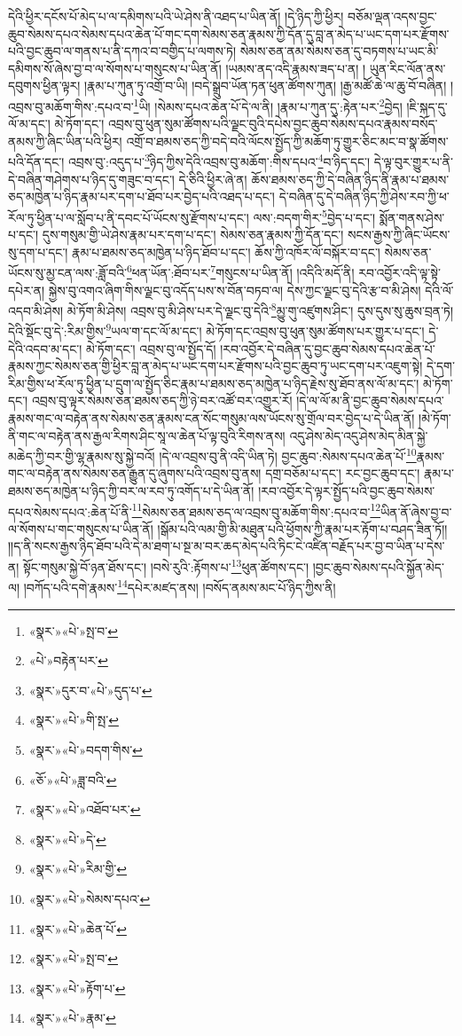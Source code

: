 དེའི་ཕྱིར་དངོས་པོ་མེད་པ་ལ་དམིགས་པའི་ཡེ་ཤེས་ནི་འཐད་པ་ཡིན་ནོ། །དེ་ཉིད་ཀྱི་ཕྱིར། བཅོམ་ལྡན་འདས་བྱང་ཆུབ་སེམས་དཔའ་སེམས་དཔའ་ཆེན་པོ་གང་དག་སེམས་ཅན་རྣམས་ཀྱི་དོན་དུ་བླ་ན་མེད་པ་ཡང་དག་པར་རྫོགས་པའི་བྱང་ཆུབ་ལ་གནས་པ་ནི་དཀའ་བ་བགྱིད་པ་ལགས་ཏེ། སེམས་ཅན་ནམ་སེམས་ཅན་དུ་བཏགས་པ་ཡང་མི་དམིགས་སོ་ཞེས་བྱ་བ་ལ་སོགས་པ་གསུངས་པ་ཡིན་ནོ། །ཡམས་ནད་འདི་རྣམས་ཟད་པ་ན། །
ཡུན་རིང་ལོན་ནས་དབུགས་ཕྱིན་ལྟར། །རྣམ་པ་ཀུན་ཏུ་འགྲོ་བ་ཡི། །བདེ་སྒྲུབ་ཡོན་ཏན་ཕུན་ཚོགས་ཀུན། །རྒྱ་མཚོ་ཆེ་ལ་ཆུ་བོ་བཞིན། །འབྲས་བུ་མཆོག་གིས་:དཔའ་བ་\footnote{«སྣར་»«པེ་»སྤ་བ་}ཡི། །སེམས་དཔའ་ཆེན་པོ་དེ་ལ་ནི། །རྣམ་པ་ཀུན་དུ་:རྟེན་པར་\footnote{«པེ་»བརྟེན་པར་}བྱེད། །ཇི་སྐད་དུ་ལོ་མ་དང་། མེ་ཏོག་དང་། འབྲས་བུ་ཕུན་སུམ་ཚོགས་པའི་ལྗང་བུའི་དཔེས་བྱང་ཆུབ་སེམས་དཔའ་རྣམས་བསོད་ནམས་ཀྱི་ཞིང་ཡིན་པའི་ཕྱིར། འགྲོ་བ་ཐམས་ཅད་ཀྱི་བདེ་བའི་ལོངས་སྤྱོད་ཀྱི་མཆོག་ཏུ་གྱུར་ཅིང་མང་བ་སྣ་ཚོགས་པའི་དོན་དང་། འབྲས་བུ་:འདུད་པ་\footnote{«སྣར་»དུར་བ་«པེ་»དུད་པ་}ཉིད་ཀྱིས་དེའི་འབྲས་བུ་མཆོག་:གིས་དཔའ་\footnote{«སྣར་»«པེ་»གི་སྤ་}བ་ཉིད་དང་། དེ་ལྟ་བུར་གྱུར་པ་ནི་དེ་བཞིན་གཤེགས་པ་ཉིད་དུ་གཟུང་བ་དང་། དེ་ཅིའི་ཕྱིར་ཞེ་ན། ཆོས་ཐམས་ཅད་ཀྱི་དེ་བཞིན་ཉིད་ནི་རྣམ་པ་ཐམས་ཅད་མཁྱེན་པ་ཉིད་རྣམ་པར་དག་པ་ཐོབ་པར་བྱེད་པའི་འཐད་པ་དང་། དེ་བཞིན་དུ་དེ་བཞིན་ཉིད་ཀྱི་ཤེས་རབ་ཀྱི་ཕ་རོལ་ཏུ་ཕྱིན་པ་ལ་སློབ་པ་ནི་དབང་པོ་ཡོངས་སུ་རྫོགས་པ་དང་། ལས་:བདག་གིར་\footnote{«སྣར་»«པེ་»བདག་གིས་}བྱེད་པ་དང་། སྨོན་གནས་ཤེས་པ་དང་། དུས་གསུམ་གྱི་ཡེ་ཤེས་རྣམ་པར་དག་པ་དང་། སེམས་ཅན་རྣམས་ཀྱི་དོན་དང་། སངས་རྒྱས་ཀྱི་ཞིང་ཡོངས་སུ་དག་པ་དང་། རྣམ་པ་ཐམས་ཅད་མཁྱེན་པ་ཉིད་ཐོབ་པ་དང་། ཆོས་ཀྱི་འཁོར་ལོ་བསྐོར་བ་དང་། སེམས་ཅན་ཡོངས་སུ་མྱ་ངན་ལས་:ཟློ་བའི་\footnote{«ཅོ་»«པེ་»ཟླ་བའི་}ཕན་ཡོན་:ཐོབ་པར་\footnote{«སྣར་»«པེ་»འཐོབ་པར་}གསུངས་པ་ཡིན་ནོ། །འདིའི་མདོ་ནི། རབ་འབྱོར་འདི་ལྟ་སྟེ་དཔེར་ན། སྐྱེས་བུ་འགའ་ཞིག་གིས་ལྗང་བུ་འདོད་པས་ས་བོན་བཏབ་ལ། དེས་ཀྱང་ལྗང་བུ་དེའི་རྩ་བ་མི་ཤེས། དེའི་ལོ་འདབ་མི་ཤེས། མེ་ཏོག་མི་ཤེས། འབྲས་བུ་མི་ཤེས་པར་དེ་ལྗང་བུ་དེའི་\footnote{«སྣར་»«པེ་»དེ་}མྱུ་གུ་འཛུགས་ཤིང་། དུས་དུས་སུ་ཆུས་བྲན་ཏེ། དེའི་སྡོང་བུ་དེ་:རིམ་གྱིས་\footnote{«སྣར་»«པེ་»རིམ་གྱི་}ཡལ་ག་དང་ལོ་མ་དང་། མེ་ཏོག་དང་འབྲས་བུ་ཕུན་སུམ་ཚོགས་པར་གྱུར་པ་དང་། དེ་དེའི་འདབ་མ་དང་། མེ་ཏོག་དང་། འབྲས་བུ་ལ་སྤྱོད་དོ། །རབ་འབྱོར་དེ་བཞིན་དུ་བྱང་ཆུབ་སེམས་དཔའ་ཆེན་པོ་རྣམས་ཀྱང་སེམས་ཅན་གྱི་ཕྱིར་བླ་ན་མེད་པ་ཡང་དག་པར་རྫོགས་པའི་བྱང་ཆུབ་ཏུ་ཡང་དག་པར་འཇུག་སྟེ། དེ་དག་རིམ་གྱིས་ཕ་རོལ་ཏུ་ཕྱིན་པ་དྲུག་ལ་སྤྱོད་ཅིང་རྣམ་པ་ཐམས་ཅད་མཁྱེན་པ་ཉིད་རྗེས་སུ་ཐོབ་ནས་ལོ་མ་དང་། མེ་ཏོག་དང་། འབྲས་བུ་ལྟར་སེམས་ཅན་ཐམས་ཅད་ཀྱི་ཉེ་བར་འཚོ་བར་འགྱུར་རོ། །དེ་ལ་ལོ་མ་ནི་བྱང་ཆུབ་སེམས་དཔའ་རྣམས་གང་ལ་བརྟེན་ནས་སེམས་ཅན་རྣམས་ངན་སོང་གསུམ་ལས་ཡོངས་སུ་གྲོལ་བར་བྱེད་པ་དེ་ཡིན་ནོ། །མེ་ཏོག་ནི་གང་ལ་བརྟེན་ནས་རྒྱལ་རིགས་ཤིང་སཱ་ལ་ཆེན་པོ་ལྟ་བུའི་རིགས་ནས། འདུ་ཤེས་མེད་འདུ་ཤེས་མེད་མིན་སྐྱེ་མཆེད་ཀྱི་བར་གྱི་ལྷ་རྣམས་སུ་སྐྱེ་བའོ། །དེ་ལ་འབྲས་བུ་ནི་འདི་ཡིན་ཏེ། བྱང་ཆུབ་:སེམས་དཔའ་ཆེན་པོ་\footnote{«སྣར་»«པེ་»སེམས་དཔའ་}རྣམས་གང་ལ་བརྟེན་ནས་སེམས་ཅན་རྒྱུན་དུ་ཞུགས་པའི་འབྲས་བུ་ནས། དགྲ་བཅོམ་པ་དང་། རང་བྱང་ཆུབ་དང་། རྣམ་པ་ཐམས་ཅད་མཁྱེན་པ་ཉིད་ཀྱི་བར་ལ་རབ་ཏུ་འགོད་པ་དེ་ཡིན་ནོ། །རབ་འབྱོར་དེ་ལྟར་སྤྱོད་པའི་བྱང་ཆུབ་སེམས་དཔའ་སེམས་དཔའ་:ཆེན་པོ་ནི་\footnote{«སྣར་»«པེ་»ཆེན་པོ་}སེམས་ཅན་ཐམས་ཅད་ལ་འབྲས་བུ་མཆོག་གིས་:དཔའ་བ་\footnote{«སྣར་»«པེ་»སྤ་བ་}ཡིན་ནོ་ཞེས་བྱ་བ་ལ་སོགས་པ་གང་གསུངས་པ་ཡིན་ནོ། །སྒོམ་པའི་ལམ་གྱི་མི་མཐུན་པའི་ཕྱོགས་ཀྱི་རྣམ་པར་རྟོག་པ་བཤད་ཟིན་ཏོ།། །།ད་ནི་སངས་རྒྱས་ཉིད་ཐོབ་པའི་དེ་མ་ཐག་པ་སྔ་མ་བར་ཆད་མེད་པའི་ཏིང་ངེ་འཛིན་བརྗོད་པར་བྱ་བ་ཡིན་པ་དེས་ན། སྟོང་གསུམ་སྐྱེ་བོ་ཉན་ཐོས་དང་། །བསེ་རུའི་:རྟོགས་པ་\footnote{«སྣར་»«པེ་»རྟོག་པ་}ཕུན་ཚོགས་དང་། །བྱང་ཆུབ་སེམས་དཔའི་སྐྱོན་མེད་ལ། །བཀོད་པའི་དགེ་རྣམས་\footnote{«སྣར་»«པེ་»རྣམ་}དཔེར་མཛད་ནས། །བསོད་ནམས་མང་པོ་ཉིད་ཀྱིས་ནི། 